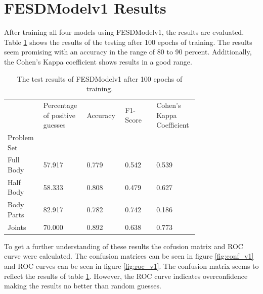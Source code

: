 \section{FESDModelv1 Results}
\label{sec:FESDModelv1_results}

After training all four models using FESDModelv1, the results are evaluated. Table \ref{tab:res_v1} shows the results of the testing after 100 epochs of training. The results seem promising with an accuracy in the range of 80 to 90 percent. Additionally, the Cohen's Kappa coefficient shows results in a good range.

\begin{table}
  \caption[Test Results of FESDModelv1]{The test results of FESDModelv1 after 100 epochs of training.}
  \label{tab:res_v1}
  \centering
  \begin{tabular}{p{0.15\linewidth}p{0.15\linewidth}p{0.15\linewidth}p{0.15\linewidth}p{0.15\linewidth}}
    \hline
    {} &  Percentage of positive guesses &  Accuracy &  F1-Score &  Cohen's Kappa Coefficient \\
    Problem Set   &                                 &           &           &                            \\
    \hline
    Full Body  &                          57.917 &     0.779 &     0.542 &                      0.539 \\
    Half Body  &                          58.333 &     0.808 &     0.479 &                      0.627 \\
    Body Parts &                          82.917 &     0.782 &     0.742 &                      0.186 \\
    Joints     &                          70.000 &     0.892 &     0.638 &                      0.773 \\
    \hline
  \end{tabular}
\end{table}

To get a further understanding of these results the cofusion matrix and ROC curve were calculated. The confusion matrices can be seen in figure \ref{fig:conf_v1} and ROC curves can be seen in figure \ref{fig:roc_v1}. The confusion matrix seems to reflect the results of table \ref{tab:res_v1}. However, the ROC curve indicates overconfidence making the results no better than random guesses.

